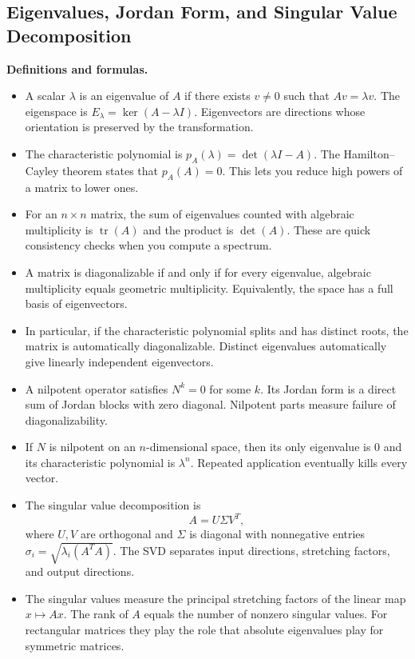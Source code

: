 \documentclass[11pt]{article}
\theoremstyle{definition}
\newcommand{\trace}{\operatorname{tr}}
\begin{document}
\subsection{Eigenvalues, Jordan Form, and Singular Value Decomposition}
\textbf{Definitions and formulas.}
\begin{itemize}
    \item A scalar $\lambda$ is an eigenvalue of $A$ if there exists $v\neq 0$ such that $Av=\lambda v$. The eigenspace is $E_\lambda=\ker(A-\lambda I)$. Eigenvectors are directions whose orientation is preserved by the transformation.
    \item The characteristic polynomial is $p_A(\lambda)=\det(\lambda I-A)$. The Hamilton--Cayley theorem states that $p_A(A)=0$. This lets you reduce high powers of a matrix to lower ones.
    \item For an $n\times n$ matrix, the sum of eigenvalues counted with algebraic multiplicity is $\trace(A)$ and the product is $\det(A)$. These are quick consistency checks when you compute a spectrum.
    \item A matrix is diagonalizable if and only if for every eigenvalue, algebraic multiplicity equals geometric multiplicity. Equivalently, the space has a full basis of eigenvectors.
    \item In particular, if the characteristic polynomial splits and has distinct roots, the matrix is automatically diagonalizable. Distinct eigenvalues automatically give linearly independent eigenvectors.
    \item A nilpotent operator satisfies $N^k=0$ for some $k$. Its Jordan form is a direct sum of Jordan blocks with zero diagonal. Nilpotent parts measure failure of diagonalizability.
    \item If $N$ is nilpotent on an $n$-dimensional space, then its only eigenvalue is $0$ and its characteristic polynomial is $\lambda^n$. Repeated application eventually kills every vector.
    \item The singular value decomposition is
    \[
        A=U\Sigma V^T,
    \]
    where $U,V$ are orthogonal and $\Sigma$ is diagonal with nonnegative entries $\sigma_i=\sqrt{\lambda_i(A^TA)}$. The SVD separates input directions, stretching factors, and output directions.
    \item The singular values measure the principal stretching factors of the linear map $x\mapsto Ax$. The rank of $A$ equals the number of nonzero singular values. For rectangular matrices they play the role that absolute eigenvalues play for symmetric matrices.

\end{itemize}
\end{document}

